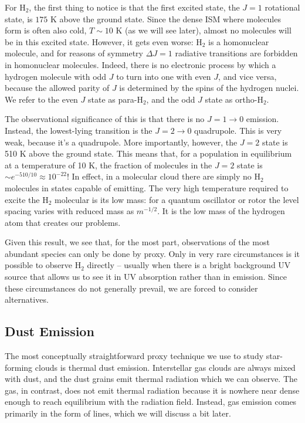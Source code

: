 For H$_2$, the first thing to notice is that the first excited state, the $J=1$ rotational state, is $175$ K above the ground state. Since the dense ISM where molecules form is often also cold, $T\sim 10$ K (as we will see later), almost no molecules will be in this excited state. However, it gets even worse: H$_2$ is a homonuclear molecule, and for reasons of symmetry $\Delta J = 1$ radiative transitions are forbidden in homonuclear molecules. Indeed, there is no electronic process by which a hydrogen molecule with odd $J$ to turn into one with even $J$, and vice versa, because the allowed parity of $J$ is determined by the spins of the hydrogen nuclei. We refer to the even $J$ state as para-H$_2$, and the odd $J$ state as ortho-H$_2$.

The observational significance of this is that there is no $J=1\rightarrow 0$ emission. Instead, the lowest-lying transition is the $J=2\rightarrow 0$ quadrupole. This is very weak, because it's a quadrupole. More importantly, however, the $J=2$ state is 510 K above the ground state. This means that, for a population in equilibrium at a temperature of 10 K, the fraction of molecules in the $J=2$ state is $\sim e^{-510/10} \approx 10^{-22}$! In effect, in a molecular cloud there are simply no H$_2$ molecules in states capable of emitting. The very high temperature required to excite the H$_2$ molecular is its low mass: for a quantum oscillator or rotor the level spacing varies with reduced mass as $m^{-1/2}$. It is the low mass of the hydrogen atom that creates our problems.
  
Given this result, we see that, for the most part, observations of the most abundant species can only be done by proxy. Only in very rare circumstances is it possible to observe H$_2$ directly -- usually when there is a bright background UV source that allows us to see it in UV absorption rather than in emission. Since these circumstances do not generally prevail, we are forced to consider alternatives.

\subsection{Dust Emission}

The most conceptually straightforward proxy technique we use to study star-forming clouds is thermal dust emission. Interstellar gas clouds are always mixed with dust, and the dust grains emit thermal radiation which we can observe. The gas, in contrast, does not emit thermal radiation because it is nowhere near dense enough to reach equilibrium with the radiation field. Instead, gas emission comes primarily in the form of lines, which we will discuss a bit later.
  
